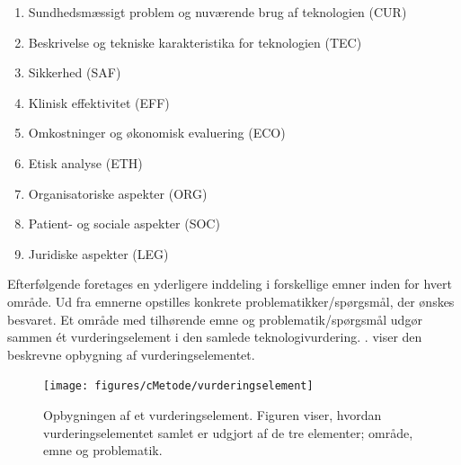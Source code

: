 \begin{enumerate}
\item Sundhedsmæssigt problem og nuværende brug af teknologien (CUR)
\item Beskrivelse og tekniske karakteristika for teknologien (TEC)
\item Sikkerhed (SAF)
\item Klinisk effektivitet (EFF)
\item Omkostninger og økonomisk evaluering (ECO)
\item Etisk analyse (ETH)
\item Organisatoriske aspekter (ORG)
\item Patient- og sociale aspekter (SOC)
\item Juridiske aspekter (LEG)
\end{enumerate}

Efterfølgende foretages en yderligere inddeling i forskellige emner inden for hvert område. Ud fra emnerne opstilles konkrete problematikker/spørgsmål, der ønskes besvaret. Et område med tilhørende emne og problematik/spørgsmål udgør sammen ét vurderingselement i den samlede teknologivurdering. \citep{HTAcore}.  viser den beskrevne opbygning af vurderingselementet. 

\begin{figure}[H] 
\begin{center}
\texttt{[image: figures/cMetode/vurderingselement]}
\end{center}
\caption{Opbygningen af et vurderingselement. Figuren viser, hvordan vurderingselementet samlet er udgjort af de tre elementer; område, emne og problematik.} 
\label{fig:vurderingselement} 
\end{figure}

